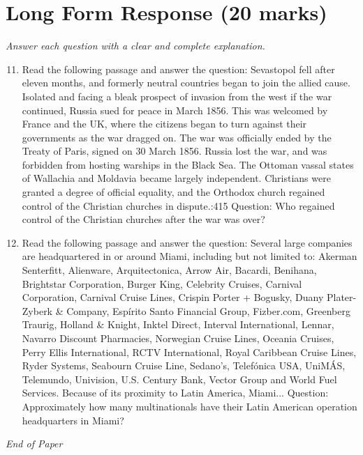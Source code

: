 \documentclass[12pt]{article}
\begin{document}
\section*{Long Form Response (20 marks)}
\textit{Answer each question with a clear and complete explanation.}
\begin{enumerate}[label=\arabic*.]
\setcounter{enumi}{10}
\item Read the following passage and answer the question: Sevastopol fell after eleven months, and formerly neutral countries began to join the allied cause. Isolated and facing a bleak prospect of invasion from the west if the war continued, Russia sued for peace in March 1856. This was welcomed by France and the UK, where the citizens began to turn against their governments as the war dragged on. The war was officially ended by the Treaty of Paris, signed on 30 March 1856. Russia lost the war, and was forbidden from hosting warships in the Black Sea. The Ottoman vassal states of Wallachia and Moldavia became largely independent. Christians were granted a degree of official equality, and the Orthodox church regained control of the Christian churches in dispute.:415 Question: Who regained control of the Christian churches after the war was over?
\item Read the following passage and answer the question: Several large companies are headquartered in or around Miami, including but not limited to: Akerman Senterfitt, Alienware, Arquitectonica, Arrow Air, Bacardi, Benihana, Brightstar Corporation, Burger King, Celebrity Cruises, Carnival Corporation, Carnival Cruise Lines, Crispin Porter + Bogusky, Duany Plater-Zyberk \& Company, Espírito Santo Financial Group, Fizber.com, Greenberg Traurig, Holland \& Knight, Inktel Direct, Interval International, Lennar, Navarro Discount Pharmacies, Norwegian Cruise Lines, Oceania Cruises, Perry Ellis International, RCTV International, Royal Caribbean Cruise Lines, Ryder Systems, Seabourn Cruise Line, Sedano's, Telefónica USA, UniMÁS, Telemundo, Univision, U.S. Century Bank, Vector Group and World Fuel Services. Because of its proximity to Latin America, Miami... Question: Approximately how many multinationals have their Latin American operation headquarters in Miami?
\end{enumerate}

\vfill
\noindent\textit{End of Paper}
\end{document}
